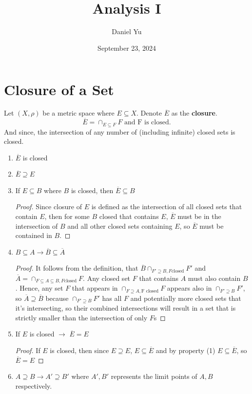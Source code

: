 \documentclass[a4paper]{article}
\title{\Huge{Analysis I}}
\author{\huge{Daniel Yu}}
\date{September 23, 2024}
\begin{document}
\maketitle
\newpage%
\tableofcontents
\pagebreak
  
\section{Closure of a Set}
\begin{definition}
  Let $(X, \rho)$ be a metric space where  $E \subseteq X$. Denote $\overline{E}$ as the \textbf{closure}.
  \[
    \overline{E} = \cap_{E \subseteq F} F \text{ and F is closed}
  .\]
  And since, the intersection of any number of (including infinite) closed sets is closed.
  \begin{enumerate}
    \item $\overline{E}$ is closed
    \item $\overline{E} \supseteq E$
    \item If $E \subseteq B$ where $B$ is closed, then $\overline{E} \subseteq B$ 
      \begin{proof}
        Since closure of $E$ is defined as the intersection of all closed sets that contain $E$, then for 
        some $B$ closed that contains $E$, $\overline{E}$ must be in the intersection of  $B$ and 
        all other closed sets containing  $E$, so  $\overline{E}$ must be contained in $B$.  
      \end{proof}
    \item $B \subseteq A \to \overline{B} \subseteq \overline{A}$
       \begin{proof}
         It follows from the definition, that $\overline{B} \cap_{F' \supseteq B, F \text{closed}} F'$ 
         and $\overline{A} = \cap_{F \subseteq A \subseteq B, F \text{closed}} F$. Any closed set
         $F$ that contains $A$ must also contain  $B$. Hence, any set  $F$ that appears in  $\cap_{F \supseteq A,
         \text{F closed}} F$ appears also in $\cap_{F' \supseteq B} F'$, so $\overline{A} \supseteq \overline{B}$ 
         because $\cap_{F' \supseteq B} F'$ has all $F$ and potentially more closed sets that it's intersecting,
         so their combined intersections will result in a set that is strictly smaller than the intersection of only
         $F$s
       \end{proof}
     \item If $E$ is closed  $\to$  $\overline{E} = E$
       \begin{proof}
         If $E$ is closed, then  since $E \supseteq E$, $E \subseteq \overline{E}$ and by property (1) 
         $E \subseteq \overline{E}$, so $\overline{E} = E$
       \end{proof}
     \item $A \supseteq B \to A' \supseteq B'$ where  $A',B'$ represents the limit points of  $A,B$ respectively. 
  \end{enumerate}
\end{definition}
\end{document}
